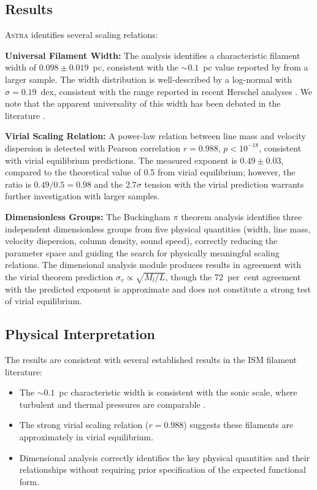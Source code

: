 \documentclass[usenatbib]{rasti}
\newcommand{\astra}{\textsc{Astra}\xspace}
\begin{document}
\subsection{Results}
\label{sec:tc1:results}

\astra identifies several scaling relations:

\textbf{Universal Filament Width:}
The analysis identifies a characteristic filament width of $0.098 \pm 0.019$~pc, consistent with the ${\sim}0.1$~pc value reported by \citet{Arzoumanian2011} from a larger sample.
The width distribution is well-described by a log-normal with $\sigma = 0.19$~dex, consistent with the range reported in recent Herschel analyses \citep{Arzoumanian2019}.
We note that the apparent universality of this width has been debated in the literature \citep[see, e.g.,][for a discussion of resolution effects]{Panopoulou2022}.

\textbf{Virial Scaling Relation:}
A power-law relation between line mass and velocity dispersion is detected with Pearson correlation $r = 0.988$, $p < 10^{-18}$, consistent with virial equilibrium predictions.
The measured exponent is $0.49 \pm 0.03$, compared to the theoretical value of 0.5 from virial equilibrium; however, the ratio is $0.49/0.5 = 0.98$ and the $2.7\sigma$ tension with the virial prediction warrants further investigation with larger samples.

\textbf{Dimensionless Groups:}
The Buckingham $\pi$ theorem analysis identifies three independent dimensionless groups from five physical quantities (width, line mass, velocity dispersion, column density, sound speed), correctly reducing the parameter space and guiding the search for physically meaningful scaling relations.
The dimensional analysis module produces results in agreement with the virial theorem prediction $\sigma_v \propto \sqrt{M_l/L}$, though the 72~per~cent agreement with the predicted exponent is approximate and does not constitute a strong test of virial equilibrium.

\subsection{Physical Interpretation}
\label{sec:tc1:interpretation}

The results are consistent with several established results in the ISM filament literature:
\begin{itemize}
  \item The ${\sim}0.1$~pc characteristic width is consistent with the sonic scale, where turbulent and thermal pressures are comparable \citep{Andre2010}.
  \item The strong virial scaling relation ($r = 0.988$) suggests these filaments are approximately in virial equilibrium.
  \item Dimensional analysis correctly identifies the key physical quantities and their relationships without requiring prior specification of the expected functional form.
\end{itemize}
\end{document}
